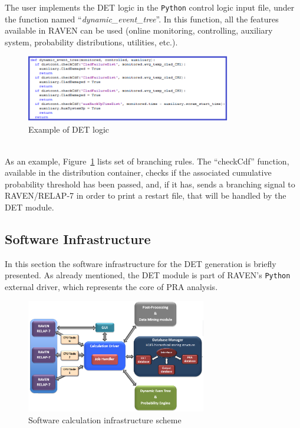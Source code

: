 The user implements the DET logic in the \verb!Python! control logic input file, under the function named ``\emph{dynamic\_event\_tree}''. In this function, all the features available in RAVEN can be used (online monitoring, controlling, auxiliary system, probability distributions, utilities, etc.). 
\begin{figure}[h] 
  \centering
     \includegraphics[width=0.8\textwidth]{figures/BranchingLaws.png}
  \caption{Example of DET logic}
   \label{fig:DET_branchLaws}
\end{figure}
\\As an example, Figure~\ref{fig:DET_branchLaws} lists set of branching rules. The ``checkCdf'' function, available in the distribution container, checks if the associated cumulative probability  threshold has been passed, and, if it has, sends a branching signal to RAVEN/RELAP-7 in order to print a restart file, that will be handled by the DET module. 
\subsection{Software Infrastructure} 
\label{sec:CPUInfrastructure}
In this section the software infrastructure for the DET generation is briefly presented. As already mentioned, the DET module is part of RAVEN's \verb!Python! external driver, which represents the core of PRA analysis.
\begin{figure}[h] 
  \centering
     \includegraphics[width=0.70\textwidth]{figures/softwareCalcStructure.png}
  \caption{Software calculation infrastructure scheme}
   \label{fig:softwareInfrastructure}
\end{figure} 

